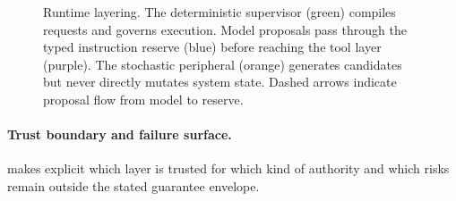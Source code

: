\documentclass[11pt]{article}
\theoremstyle{remark}
\begin{document}
\begin{figure}[H]
\caption{Runtime layering.  The deterministic supervisor (green) compiles requests and governs execution.  Model proposals pass through the typed instruction reserve (blue) before reaching the tool layer (purple).  The stochastic peripheral (orange) generates candidates but never directly mutates system state.  Dashed arrows indicate proposal flow from model to reserve.}
\label{fig:runtime-layers}
\end{figure}

\paragraph{Trust boundary and failure surface.}
 makes explicit which layer is trusted for which kind of authority and which risks remain outside the stated guarantee envelope.
\end{document}
